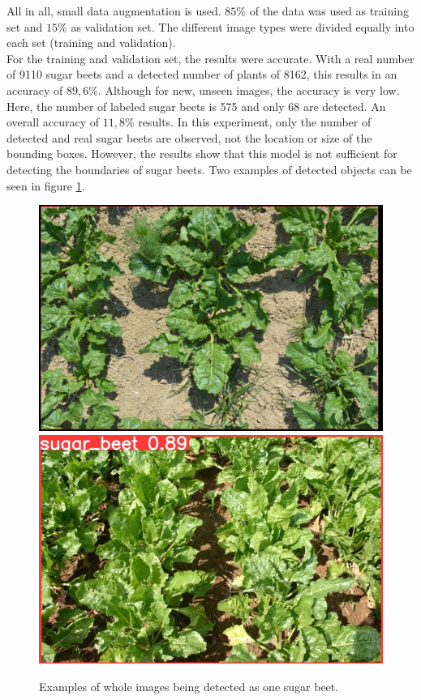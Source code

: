 All in all, small data augmentation is used. $ 85\% $ of the data was used as training set and $ 15\% $ as validation set. The different image types were divided equally into each set (training and validation).\\

For the training and validation set, the results were accurate. With a real number of 9110 sugar beets and a detected number of plants of 8162, this results in an accuracy of $ 89,6\% $. Although for new, unseen images, the accuracy is very low. Here, the number of labeled sugar beets is 575 and only 68 are detected. An overall accuracy of $ 11,8\% $ results. In this experiment, only the number of detected and real sugar beets are observed, not the location or size of the bounding boxes. However, the results show that this model is not sufficient for detecting the boundaries of sugar beets. Two examples of detected objects can be seen in figure \ref{fig:results_experiment_1}.

\begin{figure}[htb!]
	\centering
	\includegraphics[scale=0.178]{figures/results_exp1_1.png}
	\includegraphics[scale=0.33]{figures/results_exp1_2.JPEG}
	\caption{Examples of whole images being detected as one sugar beet.}
	\label{fig:results_experiment_1}
\end{figure}

